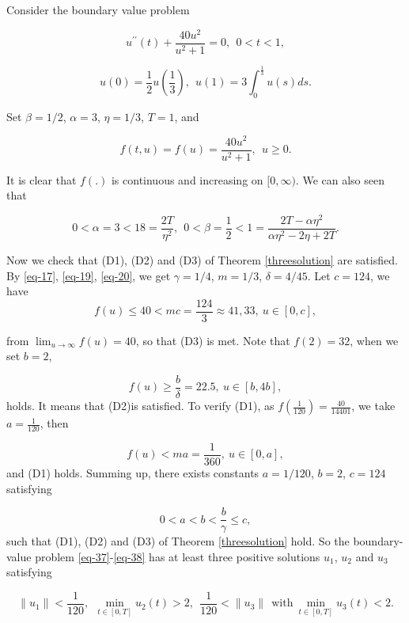 \documentclass[reqno]{amsart}\usepackage{amsmath}
\begin{document}
\begin{example}
Consider the boundary value problem

\begin{equation}\label{eq-37}
{u^{\prime \prime }}(t)+\frac{40u^{2}}{u^{2}+1}=0, \  \ 0<t<1,
\end{equation}

\begin{equation}\label{eq-38}
u(0)=\frac{1}{2}u(\frac{1}{3}), \  \ u(1)=3 \int_{0}^{\frac{1}{3}}u(s)ds.
\end{equation}

Set $\beta=1/2$, $\alpha=3$, $\eta=1/3$, $T=1$, and


\[f(t, u)=f(u)=\frac{40u^{2}}{u^{2}+1}, \ \ u\geq0.\]

It is clear that $f(.)$ is continuous and increasing on $[0, \infty)$. We can also seen that

\[0<\alpha=3<18=\frac{2T}{\eta^{2}}, \ \ 0<\beta=\frac{1}{2}<1=\frac{2T-\alpha \eta ^{2}}{\alpha \eta ^{2}-2\eta
+2T}.\]

Now we check that {\rm (D1)}, {\rm (D2)} and {\rm (D3)} of Theorem \ref{threesolution} are satisfied.
By \eqref{eq-17}, \eqref{eq-19}, \eqref{eq-20}, we get $\gamma=1/4$, $m=1/3$, $\delta=4/45$. Let $c=124$, we have
\[f(u)\leq40<mc=\frac{124}{3}\approx41,33, \ u\in[0, c], \]

from $\lim_{u\rightarrow\infty}f(u)=40$, so that {\rm (D3)} is met. Note that $f(2)=32$, when we set $b=2$,

\[f(u)\geq\frac{b}{\delta}=22.5, \ u\in[b, 4b],\]
holds. It means that {\rm (D2)}is satisfied. To verify {\rm (D1)}, as $f(\frac{1}{120})=\frac{40}{14401}$, we take $a=\frac{1}{120}$, then

\[f(u)<ma=\frac{1}{360}, \ u\in[0, a],\]
and {\rm (D1)} holds.
Summing up, there exists constants $a=1/120$, $b=2$, $c=124$ satisfying

\[0<a<b<\frac{b}{\gamma}\leq c,\]
such that {\rm (D1)}, {\rm (D2)} and {\rm (D3)} of Theorem \ref{threesolution} hold. So the boundary-value problem \eqref{eq-37}-\eqref{eq-38}  has at least three positive solutions $u_{1}$, $u_{2}$ and $u_{3}$ satisfying


\[\|u_{1}\|<\frac{1}{120}, \ \  \min_{t\in[0, T]}u_{2}(t)>2, \ \ \frac{1}{120}<\|u_{3}\| \ \ \text{with} \ \min_{t\in[0, T]}u_{3}(t)<2 .\]



\end{example}
\end{document}
